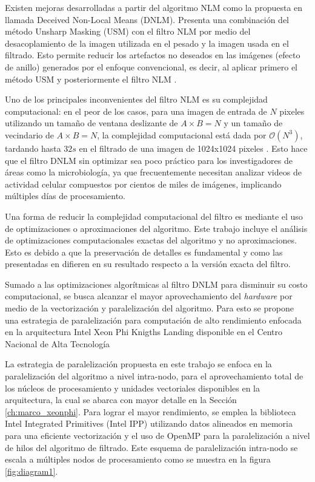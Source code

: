 Existen mejoras desarrolladas a partir del algoritmo NLM como la propuesta en \cite{calderon2015dewaff} llamada Deceived Non-Local Means (DNLM). Presenta una combinaci\'on del m\'etodo Unsharp Masking (USM) con el filtro NLM por medio del desacoplamiento de la imagen utilizada en el pesado y la imagen usada en el filtrado. Esto permite reducir los artefactos no deseados en las im\'agenes (efecto de anillo) generados por el enfoque convencional, es decir, al aplicar primero el m\'etodo USM y posteriormente el filtro NLM \cite{calderon2015dewaff}.  

Uno de los principales inconvenientes del filtro NLM es su complejidad computacional: en el peor de los casos, para una imagen de entrada de $N$ pixeles utilizando un tamaño de ventana deslizante de $A\times B = N$ y un tamaño de vecindario de $A\times B = N$, la complejidad computacional est\'a dada por $\mathcal{O}(N^{3})$, tardando hasta $32s$ en el filtrado de una imagen de 1024x1024 pixeles \cite{Zhu2016}. Esto hace que el filtro DNLM sin optimizar sea poco pr\'actico para los investigadores de \'areas como la microbiolog\'ia, ya que frecuentemente necesitan analizar videos de actividad celular compuestos por cientos de miles de im\'agenes, implicando m\'ultiples d\'ias de procesamiento. 

Una forma de reducir la complejidad computacional del filtro es mediante el uso de optimizaciones o aproximaciones del algoritmo. Este trabajo incluye el an\'alisis de optimizaciones computacionales exactas del algoritmo y no aproximaciones. Esto es debido a que la preservaci\'on de detalles es fundamental y como las presentadas en \cite{Orchard2008,Tasdizen2009} difieren en su resultado respecto a la versi\'on exacta del filtro. 

Sumado a las optimizaciones algor\'itmicas al filtro DNLM para disminuir su costo computacional, se busca alcanzar el mayor aprovechamiento del \textit{hardware} por medio de la vectorizaci\'on y paralelizaci\'on del algoritmo. Para esto se propone una estrategia de paralelizaci\'on para computaci\'on de alto rendimiento enfocada en la arquitectura Intel Xeon Phi Knigths Landing disponible en el Centro Nacional de Alta Tecnolog\'ia

La estrategia de paralelizaci\'on propuesta en este trabajo se enfoca en la paralelizaci\'on del algoritmo a nivel intra-nodo, para el aprovechamiento total de los n\'ucleos de procesamiento y unidades vectoriales disponibles en la arquitectura, la cual se abarca con mayor detalle en la Secci\'on \ref{ch:marco_xeonphi}. Para lograr el mayor rendimiento, se emplea la biblioteca Intel Integrated Primitives (Intel IPP) utilizando datos alineados en memoria para una eficiente vectorizaci\'on y el uso de OpenMP para la paralelizaci\'on a nivel de hilos del algoritmo de filtrado. Este esquema de paralelizaci\'on intra-nodo se escala a m\'ultiples nodos de procesamiento como se muestra en la figura \ref{fig:diagram1}.



